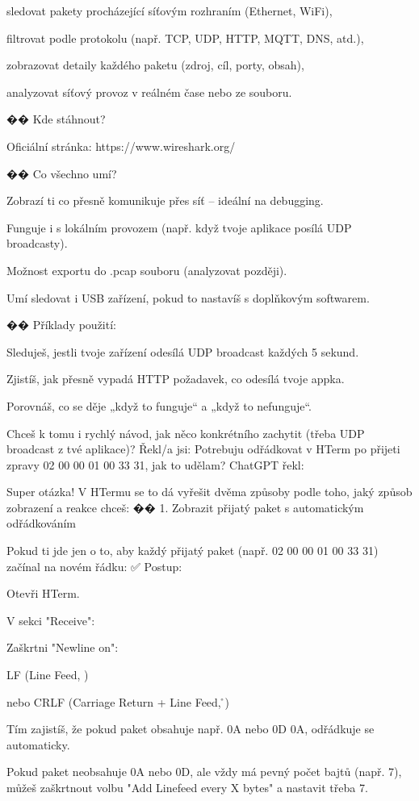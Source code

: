    sledovat pakety procházející síťovým rozhraním (Ethernet, WiFi),

    filtrovat podle protokolu (např. TCP, UDP, HTTP, MQTT, DNS, atd.),

    zobrazovat detaily každého paketu (zdroj, cíl, porty, obsah),

    analyzovat síťový provoz v reálném čase nebo ze souboru.

�� Kde stáhnout?

    Oficiální stránka: https://www.wireshark.org/

�� Co všechno umí?

    Zobrazí ti co přesně komunikuje přes síť – ideální na debugging.

    Funguje i s lokálním provozem (např. když tvoje aplikace posílá UDP broadcasty).

    Možnost exportu do .pcap souboru (analyzovat později).

    Umí sledovat i USB zařízení, pokud to nastavíš s doplňkovým softwarem.

�� Příklady použití:

    Sleduješ, jestli tvoje zařízení odesílá UDP broadcast každých 5 sekund.

    Zjistíš, jak přesně vypadá HTTP požadavek, co odesílá tvoje appka.

    Porovnáš, co se děje „když to funguje“ a „když to nefunguje“.

Chceš k tomu i rychlý návod, jak něco konkrétního zachytit (třeba UDP broadcast z tvé aplikace)?
Řekl/a jsi:
Potrebuju odřádkovat v HTerm po přijeti zpravy 02 00 00 01 00 33 31, jak to udělam?
ChatGPT řekl:

Super otázka! V HTermu se to dá vyřešit dvěma způsoby podle toho, jaký způsob zobrazení a reakce chceš:
�� 1. Zobrazit přijatý paket s automatickým odřádkováním

Pokud ti jde jen o to, aby každý přijatý paket (např. 02 00 00 01 00 33 31) začínal na novém řádku:
✅ Postup:

    Otevři HTerm.

    V sekci "Receive":

        Zaškrtni "Newline on":

            LF (Line Feed, \n)

            nebo CRLF (Carriage Return + Line Feed, \r\n)

        Tím zajistíš, že pokud paket obsahuje např. 0A nebo 0D 0A, odřádkuje se automaticky.

    Pokud paket neobsahuje 0A nebo 0D, ale vždy má pevný počet bajtů (např. 7), můžeš zaškrtnout volbu "Add Linefeed every X bytes" a nastavit třeba 7.

